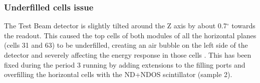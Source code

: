 \documentclass[12pt,a4paper]{article}
\begin{document}
\subsubsection*{Underfilled cells issue}
The Test Beam detector is slightly tilted around the Z axis by about 0.7$^{\circ}$ towards the readout. This caused the top cells of both modules of all the horizontal planes (cells 31 and 63) to be underfilled, creating an air bubble on the left side of the detector and severely affecting the energy response in those cells \cite{TeresaThesis}. This has been fixed \cite{NOVA-doc-49439} during the period 3 running by adding extensions to the filling ports and overfilling the horizontal cells with the ND+NDOS scintillator (sample 2).


\end{document}
